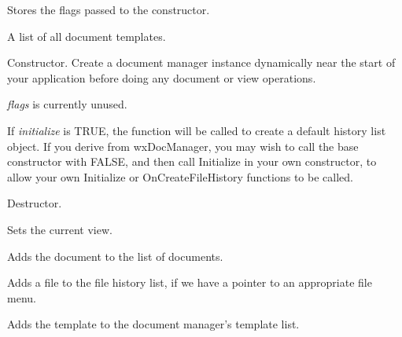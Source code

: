 Stores the flags passed to the constructor.



A list of all document templates.



Constructor. Create a document manager instance dynamically near the start of your application
before doing any document or view operations.

{\it flags} is currently unused.

If {\it initialize} is TRUE, the  function will be called
to create a default history list object. If you derive from wxDocManager, you may wish to call the
base constructor with FALSE, and then call Initialize in your own constructor, to allow
your own Initialize or OnCreateFileHistory functions to be called.



Destructor.



Sets the current view.



Adds the document to the list of documents.



Adds a file to the file history list, if we have a pointer to an appropriate file menu.



Adds the template to the document manager's template list.

